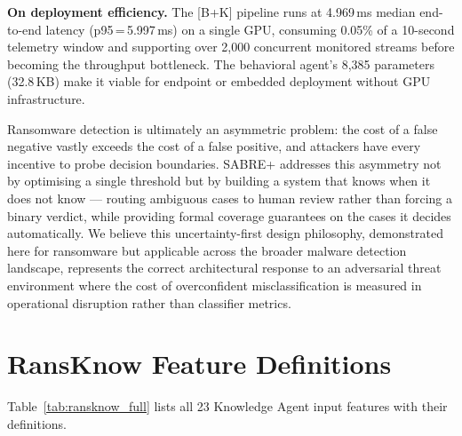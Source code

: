\documentclass[journal]{IEEEtran}
\begin{document}
\textbf{On deployment efficiency.}
The [B+K] pipeline runs at 4.969\,ms median end-to-end latency (p95\,=\,5.997\,ms) on a
single GPU, consuming 0.05\% of a 10-second telemetry window and supporting over 2,000
concurrent monitored streams before becoming the throughput bottleneck.
The behavioral agent's 8,385 parameters (32.8\,KB) make it viable for endpoint or
embedded deployment without GPU infrastructure.

Ransomware detection is ultimately an asymmetric problem: the cost of a false negative
vastly exceeds the cost of a false positive, and attackers have every incentive to probe
decision boundaries.
SABRE+ addresses this asymmetry not by optimising a single threshold but by building a
system that knows when it does not know --- routing ambiguous cases to human review rather
than forcing a binary verdict, while providing formal coverage guarantees on the cases it
decides automatically.
We believe this uncertainty-first design philosophy, demonstrated here for ransomware but
applicable across the broader malware detection landscape, represents the correct
architectural response to an adversarial threat environment where the cost of overconfident
misclassification is measured in operational disruption rather than classifier metrics.

\appendix
\section{RansKnow Feature Definitions}
\label{app:ransknow}

Table~\ref{tab:ransknow_full} lists all 23 Knowledge Agent input
features with their definitions.
\end{document}
